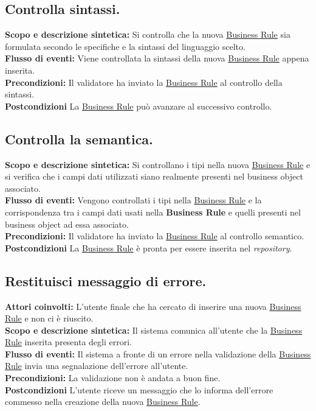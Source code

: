 \subsection{Controlla sintassi.}
\textbf{Scopo e descrizione sintetica:} Si controlla che la nuova \underline{Business Rule} sia formulata secondo le specifiche e la sintassi del linguaggio scelto.\\
\textbf{Flusso di eventi:} Viene controllata la sintassi della nuova \underline{Business Rule} appena inserita.\\
\textbf{Precondizioni:} Il validatore ha inviato la \underline{Business Rule} al controllo della sintassi.\\
\textbf{Postcondizioni} La \underline{Business Rule} pu\`o avanzare al successivo controllo.

\subsection{Controlla la semantica.}
\textbf{Scopo e descrizione sintetica:} Si controllano i tipi nella nuova \underline{Business Rule} e si verifica che i campi dati utilizzati siano realmente presenti nel business object associato.\\
\textbf{Flusso di eventi:} Vengono controllati i tipi nella \underline{Business Rule} e la corrispondenza tra i campi dati usati nella \textbf{Business Rule} e quelli presenti nel business object ad essa associato.\\
\textbf{Precondizioni:} Il validatore ha inviato la \underline{Business Rule} al controllo semantico.\\
\textbf{Postcondizioni} La \underline{Business Rule} \`e pronta per essere inserita nel \textit{repository}.

\subsection{Restituisci messaggio di errore.}
\textbf{Attori coinvolti:} L'utente finale che ha cercato di inserire una nuova \underline{Business Rule} e non ci \`e riuscito.\\
\textbf{Scopo e descrizione sintetica:} Il sistema comunica all'utente che la \underline{Business Rule} inserita presenta degli errori.\\
\textbf{Flusso di eventi:} Il sistema  a fronte di un errore nella validazione della \underline{Business Rule} invia una segnalazione dell'errore all'utente.\\
\textbf{Precondizioni:} La validazione non \`e andata a buon fine.\\
\textbf{Postcondizioni} L'utente riceve un messaggio che lo informa dell'errore commesso nella creazione della nuova \underline{Business Rule}.

